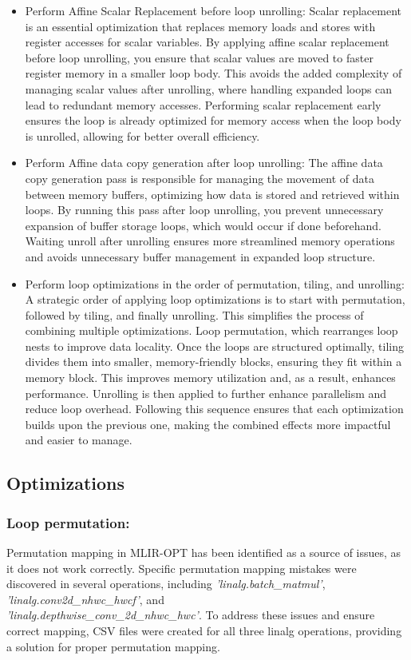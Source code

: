 \begin{itemize}
    
    \item Perform Affine Scalar Replacement before loop unrolling: Scalar replacement is an essential optimization that replaces memory loads and stores with register accesses for scalar variables. By applying affine scalar replacement before loop unrolling, you ensure that scalar values are moved to faster register memory in a smaller loop body. This avoids the added complexity of managing scalar values after unrolling, where handling expanded loops can lead to redundant memory accesses. Performing scalar replacement early ensures the loop is already optimized for memory access when the loop body is unrolled, allowing for better overall efficiency.

    \item Perform Affine data copy generation after loop unrolling: The affine data copy generation pass is responsible for managing the movement of data between memory buffers, optimizing how data is stored and retrieved within loops. By running this pass after loop unrolling, you prevent unnecessary expansion of buffer storage loops, which would occur if done beforehand. Waiting unroll after unrolling ensures more streamlined memory operations and avoids unnecessary buffer management in expanded loop structure.

    \item Perform loop optimizations in the order of permutation, tiling, and unrolling: A strategic order of applying loop optimizations is to start with permutation, followed by tiling, and finally unrolling. This simplifies the process of combining multiple optimizations. Loop permutation, which rearranges loop nests to improve data locality. Once the loops are structured optimally, tiling divides them into smaller, memory-friendly blocks, ensuring they fit within a memory block. This improves memory utilization and, as a result, enhances performance. Unrolling is then applied to further enhance parallelism and reduce loop overhead. Following this sequence ensures that each optimization builds upon the previous one, making the combined effects more impactful and easier to manage.
\end{itemize}

\subsection{Optimizations}
\subsubsection{Loop permutation:}
Permutation mapping in MLIR-OPT has been identified as a source of issues, as it does not work correctly. Specific permutation mapping mistakes were discovered in several operations, including \textit{'linalg.batch\_matmul'}, \textit{'linalg.conv2d\_nhwc\_hwcf'}, and \\ \textit{'linalg.depthwise\_conv\_2d\_nhwc\_hwc'}. To address these issues and ensure correct mapping, CSV files were created for all three linalg operations, providing a solution for proper permutation mapping.


